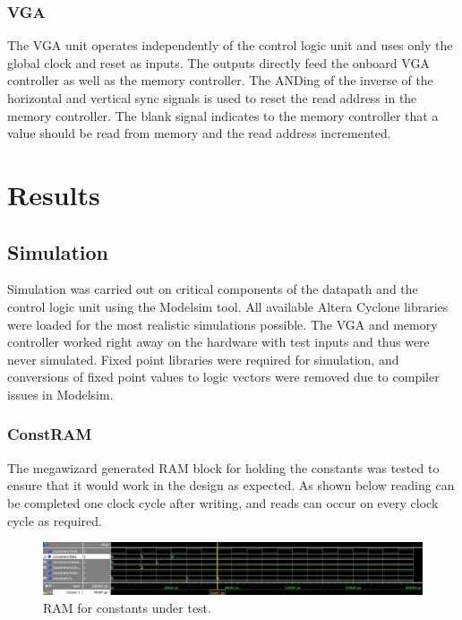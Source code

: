 \documentclass[titlepage]{article}      %
\begin{document}
\subsubsection{VGA}
The VGA unit operates independently of the control logic unit and uses only the global clock and reset as inputs. The outputs directly feed the onboard VGA controller as well as the memory controller. The ANDing of the inverse of the horizontal and vertical sync signals is used to reset the read address in the memory controller. The blank signal indicates to the memory controller that a value should be read from memory and the read address incremented.
\section{Results}
\subsection{Simulation}
Simulation was carried out on critical components of the datapath and the control logic unit using the Modelsim tool. All available Altera Cyclone libraries were loaded for the most realistic simulations possible. The VGA and memory controller worked right away on the hardware with test inputs and thus were never simulated. Fixed point libraries were required for simulation, and conversions of fixed point values to logic vectors were removed due to compiler issues in Modelsim.
\subsubsection{ConstRAM}
The megawizard generated RAM block for holding the constants was tested to ensure that it would work in the design as expected. As shown below reading can be completed one clock cycle after writing, and reads can occur on every clock cycle as required.
\begin{figure}[H]
\centering
\includegraphics[width=6in]{ConstRAM}
\caption{RAM for constants under test.}
\end{figure}
\end{document}

